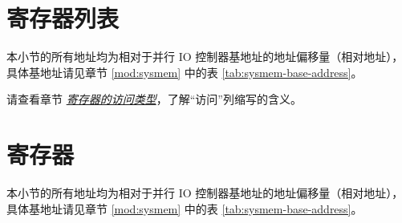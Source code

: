 \documentclass[main\_\_CN.tex]{subfiles}
\begin{document}



\newpage
\hypertarget{parlio-reg-summ}{}
\section{寄存器列表}
\label{sec:parlio-reg-summ}

本小节的所有地址均为相对于并行 IO 控制器基地址的地址偏移量（相对地址），具体基地址请见章节 \ref{mod:sysmem} \textit{} 中的表 \ref{tab:sysmem-base-address}。

请查看章节 \hyperref[glossary-access-types]{\textit{寄存器的访问类型}}，了解“访问”列缩写的含义。






\newpage
\section{寄存器}

本小节的所有地址均为相对于并行 IO 控制器基地址的地址偏移量（相对地址），具体基地址请见章节 \ref{mod:sysmem} \textit{} 中的表 \ref{tab:sysmem-base-address}。


\end{document}
